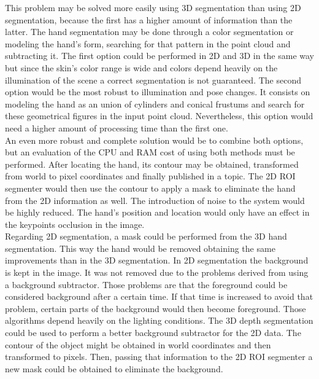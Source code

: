 	This problem may be solved more easily using 3D segmentation than using 2D segmentation, because the first has a higher amount of information than the latter.
	The hand segmentation may be done through a color segmentation or modeling the hand's form, searching for that pattern in the point cloud and subtracting it. 
	The first option could be performed in 2D and 3D in the same way but since the skin's color range is wide and colors depend heavily on the illumination of the scene a correct segmentation is not guaranteed.  
	The second option would be the most robust to illumination and pose changes. 
	It consists on modeling the hand as an union of cylinders and conical frustums and search for these geometrical figures in the input point cloud. 
	Nevertheless, this option would need a higher amount of processing time than the first one. 
	\\
	\newpage
	An even more robust and complete solution would be to combine both options, but an evaluation of the CPU and RAM cost of using both methods must be performed.
	After locating the hand, its contour may be obtained, transformed from world to pixel coordinates and finally published in a topic.
	The 2D ROI segmenter would then use the contour to apply a mask to eliminate the hand from the 2D information as well. 
	The introduction of noise to the system would be highly reduced.
	The hand's position and location would only have an effect in the keypoints occlusion in the image. 
	\\

	Regarding 2D segmentation, a mask could be performed from the 3D hand segmentation. 
	This way the hand would be removed obtaining the same improvements than in the 3D segmentation. 
	In 2D segmentation the background is kept in the image. 
	It was not removed due to the problems derived from using a background subtractor. 
	Those problems are that the foreground could be considered background after a certain time. 
	If that time is increased to avoid that problem, certain parts of the background would then become foreground. 
	Those algorithms depend heavily on the lighting conditions. 
	The 3D depth segmentation could be used to perform a better background subtractor for the 2D data. 
	The contour of the object might be obtained in world coordinates and then transformed to pixels. 
	Then, passing that information to the 2D ROI segmenter a new mask could be obtained to eliminate the background. 
	\\



